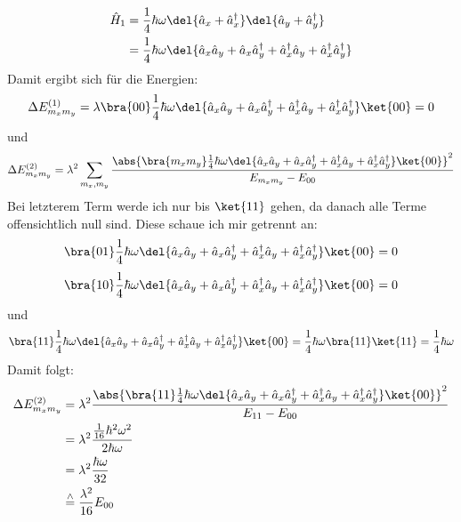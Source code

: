 \documentclass[11pt, ngerman, fleqn, DIV=15, headinclude]{scrartcl}
\begin{document}
\begin{align*}
	\hat{H}_1	&= \frac14\hbar\omega\del{\hat{a}_x + \hat{a}_x^{\dagger}}\del{\hat{a}_y + \hat{a}_y^\dagger}\\
				&= \frac14\hbar\omega\del{\hat{a}_x\hat{a}_y + \hat{a}_x\hat{a}_y^{\dagger} + \hat{a}_x^{\dagger}\hat{a}_y + \hat{a}_x^{\dagger}\hat{a}_y^{\dagger}}
\end{align*}
Damit ergibt sich für die Energien:
\begin{align*}
	\Delta E_{m_xm_y}^{(1)} = \lambda\bra{00}\frac14\hbar\omega\del{\hat{a}_x\hat{a}_y + \hat{a}_x\hat{a}_y^{\dagger} + \hat{a}_x^{\dagger}\hat{a}_y + \hat{a}_x^{\dagger}\hat{a}_y^{\dagger}}\ket{00} = 0
\end{align*}
und
\begin{align*}
	\Delta E_{m_xm_y}^{(2)} = \lambda^2\sum_{m_x,m_y}\frac{\abs{\bra{m_xm_y}\frac14\hbar\omega\del{\hat{a}_x\hat{a}_y + \hat{a}_x\hat{a}_y^{\dagger} + \hat{a}_x^{\dagger}\hat{a}_y + \hat{a}_x^{\dagger}\hat{a}_y^{\dagger}}\ket{00}}^2}{E_{m_xm_y} - E_{00}}
\end{align*}
Bei letzterem Term werde ich nur bis $\ket{11}$ gehen, da danach alle Terme offensichtlich null sind. Diese schaue ich mir getrennt an:
\begin{align*}
	\bra{01}\frac14\hbar\omega\del{\hat{a}_x\hat{a}_y + \hat{a}_x\hat{a}_y^{\dagger} + \hat{a}_x^{\dagger}\hat{a}_y + \hat{a}_x^{\dagger}\hat{a}_y^{\dagger}}\ket{00} = 0
\end{align*}
\begin{align*}
	\bra{10}\frac14\hbar\omega\del{\hat{a}_x\hat{a}_y + \hat{a}_x\hat{a}_y^{\dagger} + \hat{a}_x^{\dagger}\hat{a}_y + \hat{a}_x^{\dagger}\hat{a}_y^{\dagger}}\ket{00} = 0
\end{align*}
und
\begin{align*}
	\bra{11}\frac14\hbar\omega\del{\hat{a}_x\hat{a}_y + \hat{a}_x\hat{a}_y^{\dagger} + \hat{a}_x^{\dagger}\hat{a}_y + \hat{a}_x^{\dagger}\hat{a}_y^{\dagger}}\ket{00} = \frac14\hbar\omega\bra{11}\ket{11} = \frac14\hbar\omega
\end{align*}
Damit folgt:
\begin{align*}
	\Delta E_{m_xm_y}^{(2)}	&= \lambda^2\frac{\abs{\bra{11}\frac14\hbar\omega\del{\hat{a}_x\hat{a}_y + \hat{a}_x\hat{a}_y^{\dagger} + \hat{a}_x^{\dagger}\hat{a}_y + \hat{a}_x^{\dagger}\hat{a}_y^{\dagger}}\ket{00}}^2}{E_{11} - E_{00}}\\
							&= \lambda^2\frac{\frac1{16}\hbar^2\omega^2}{2\hbar\omega}\\
							&= \lambda^2\frac{\hbar\omega}{32}\\
							&\overset{\wedge}{=} \frac{\lambda^2}{16}E_{00}
\end{align*}
\end{document}
